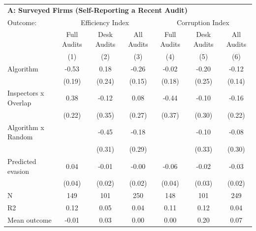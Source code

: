 \begin{tabular}{lccc|ccc} \toprule
\multicolumn{7}{l}{\textbf{A: Surveyed Firms (Self-Reporting a Recent Audit)}} \\ \multicolumn{1}{l}{Outcome:} & \multicolumn{3}{c}{Efficiency Index} & \multicolumn{3}{c}{Corruption Index} \\ \multicolumn{1}{l}{} & Full Audits & Desk Audits & All Audits & Full Audits & Desk Audits & All Audits \\ \multicolumn{1}{l}{} & (1) & (2) & (3) & (4) & (5) & (6) \\ \midrule
Algorithm   &       -0.53\sym{***}&        0.18         &       -0.26\sym{*}  &       -0.02         &       -0.20         &       -0.12         \\
            &      (0.19)         &      (0.24)         &      (0.15)         &      (0.18)         &      (0.25)         &      (0.14)         \\
\addlinespace
Inspectors x Overlap&        0.38\sym{*}  &       -0.12         &        0.08         &       -0.44         &       -0.10         &       -0.16         \\
            &      (0.22)         &      (0.35)         &      (0.27)         &      (0.37)         &      (0.30)         &      (0.22)         \\
\addlinespace
Algorithm x Random&                     &       -0.45         &       -0.18         &                     &       -0.10         &       -0.08         \\
            &                     &      (0.31)         &      (0.29)         &                     &      (0.33)         &      (0.30)         \\
\addlinespace
Predicted evasion&        0.04         &       -0.01         &       -0.00         &       -0.06         &       -0.02         &       -0.03         \\
            &      (0.04)         &      (0.02)         &      (0.02)         &      (0.04)         &      (0.03)         &      (0.02)         \\
\midrule
N           &         149         &         101         &         250         &         148         &         101         &         249         \\
R2          &        0.12         &        0.05         &        0.04         &        0.11         &        0.12         &        0.04         \\
Mean outcome&       -0.01         &        0.03         &        0.00         &        0.00         &        0.20         &        0.07         \\


\end{tabular}
